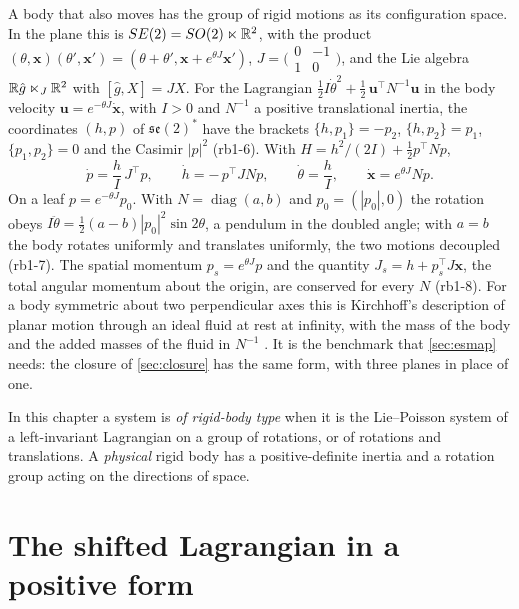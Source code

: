 A body that also moves has the group of rigid motions as its configuration space. In the plane this is $SE(2)=SO(2)\ltimes\mathbb{R}^2$, with the
product $(\theta,\mathbf x)(\theta',\mathbf x')=(\theta+\theta',\mathbf x+e^{\theta J}\mathbf x')$, $J=\bigl(\begin{smallmatrix}0&-1\\1&0\end{smallmatrix}\bigr)$, and
the Lie algebra $\mathbb{R}\hat g\ltimes_J\mathbb{R}^2$ with $[\hat g,X]=JX$. For the Lagrangian $\tfrac12I\dot\theta^2+\tfrac12\,\mathbf u^{\!\top}N^{-1}\mathbf u$ in the
body velocity $\mathbf u=e^{-\theta J}\dot{\mathbf x}$, with $I>0$ and $N^{-1}$ a positive translational inertia, the coordinates $(h,p)$ of
$\mathfrak{se}(2)^*$ have the brackets $\{h,p_1\}=-p_2$, $\{h,p_2\}=p_1$, $\{p_1,p_2\}=0$ and the Casimir $|p|^2$ (rb1-6). With
$H=h^2/(2I)+\tfrac12p^{\!\top}Np$,
\begin{equation}
\label{eq:rb:se2}
\dot p=\frac hI\,J^{\!\top}p,\qquad \dot h=-\,p^{\!\top}JNp,\qquad \dot\theta=\frac hI,\qquad \dot{\mathbf x}=e^{\theta J}Np .
\end{equation}
On a leaf $p=e^{-\theta J}p_0$. With $N=\operatorname{diag}(a,b)$ and $p_0=(|p_0|,0)$ the rotation obeys $I\ddot\theta=\tfrac12(a-b)|p_0|^2\sin2\theta$, a
pendulum in the doubled angle; with $a=b$ the body rotates uniformly and translates uniformly, the two motions decoupled (rb1-7). The spatial
momentum $p_s=e^{\theta J}p$ and the quantity $J_s=h+p_s^{\!\top}J\mathbf x$, the total angular momentum about the origin, are conserved for every
$N$ (rb1-8). For a body symmetric about two perpendicular axes this is Kirchhoff's description of planar motion through an ideal fluid at rest at
infinity, with the mass of the body and the added masses of the fluid in $N^{-1}$ \cite{Kirchhoff1870,Lamb1932}. It is the benchmark that \cref{sec:esmap} needs: the closure of \cref{sec:closure} has the same form, with three
planes in place of one.

In this chapter a system is \emph{of rigid-body type} when it is the Lie--Poisson system of a left-invariant Lagrangian on a group of rotations,
or of rotations and translations. A \emph{physical} rigid body has a positive-definite inertia and a rotation group acting on the directions
of space.



\section{The shifted Lagrangian in a positive form}
\label{sec:shifted}

